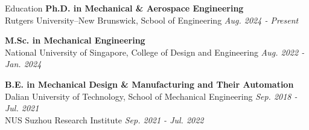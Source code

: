 \documentclass{resume} %
\begin{document}
\begin{rSection}{Education}
{\bf Ph.D. in Mechanical \& Aerospace Engineering} \\
Rutgers University–New Brunswick, Scbool of Engineering \hfill {\em Aug. 2024 - Present}\\	

\vspace{-1em}

{\bf M.Sc. in Mechanical Engineering} \\
National University of Singapore, College of Design and Engineering \hfill {\em Aug. 2022 - Jan. 2024}\\

\vspace{-1em}

{\bf B.E. in Mechanical Design \& Manufacturing and Their Automation} \\
Dalian University of Technology, School of Mechanical Engineering \hfill {\em Sep. 2018 - Jul. 2021}\\
NUS Suzhou Research Institute
\hfill {\em Sep. 2021 - Jul. 2022}\\
\end{rSection}

\vspace{-1em}


\end{document}

